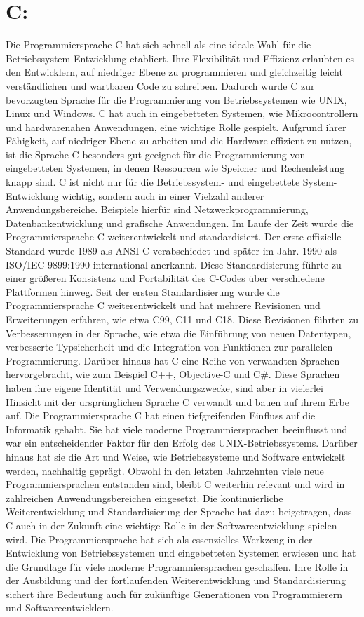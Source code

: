 \section{C:}
Die Programmiersprache C hat sich schnell als eine ideale Wahl für die Betriebssystem-Entwicklung etabliert. Ihre Flexibilität und Effizienz erlaubten es den Entwicklern, auf niedriger Ebene zu programmieren und gleichzeitig leicht verständlichen und wartbaren Code zu schreiben. 
Dadurch wurde C zur bevorzugten Sprache für die Programmierung von Betriebssystemen wie UNIX, Linux und Windows. C hat auch in eingebetteten Systemen, wie Mikrocontrollern und hardwarenahen Anwendungen, eine wichtige Rolle gespielt. 
Aufgrund ihrer Fähigkeit, auf niedriger Ebene zu arbeiten und die Hardware effizient zu nutzen, ist die Sprache C besonders gut geeignet für die Programmierung von eingebetteten Systemen, in denen Ressourcen wie Speicher und Rechenleistung knapp sind. 
C ist nicht nur für die Betriebssystem- und eingebettete System-Entwicklung wichtig, sondern auch in einer Vielzahl anderer Anwendungsbereiche. 
Beispiele hierfür sind Netzwerkprogrammierung, Datenbankentwicklung und grafische Anwendungen. Im Laufe der Zeit wurde die Programmiersprache C weiterentwickelt und standardisiert. 
Der erste offizielle Standard wurde 1989 als ANSI C verabschiedet und später im Jahr. 1990 als ISO/IEC 9899:1990 international anerkannt. Diese Standardisierung führte zu einer größeren Konsistenz und Portabilität des C-Codes über verschiedene Plattformen hinweg. 
Seit der ersten Standardisierung wurde die Programmiersprache C weiterentwickelt und hat mehrere Revisionen und Erweiterungen erfahren, wie etwa C99, C11 und C18. 
Diese Revisionen führten zu Verbesserungen in der Sprache, wie etwa die Einführung von neuen Datentypen, verbesserte Typsicherheit und die Integration von Funktionen zur parallelen Programmierung.
Darüber hinaus hat C eine Reihe von verwandten Sprachen hervorgebracht, wie zum Beispiel C++, Objective-C und C\#. 
Diese Sprachen haben ihre eigene Identität und Verwendungszwecke, sind aber in vielerlei Hinsicht mit der ursprünglichen Sprache C verwandt und bauen auf ihrem Erbe auf.
Die Programmiersprache C hat einen tiefgreifenden Einfluss auf die Informatik gehabt. Sie hat viele moderne Programmiersprachen beeinflusst und war ein entscheidender Faktor für den Erfolg des UNIX-Betriebssystems. 
Darüber hinaus hat sie die Art und Weise, wie Betriebssysteme und Software entwickelt werden, nachhaltig geprägt. 
Obwohl in den letzten Jahrzehnten viele neue Programmiersprachen entstanden sind, bleibt C weiterhin relevant und wird in zahlreichen Anwendungsbereichen eingesetzt. 
Die kontinuierliche Weiterentwicklung und Standardisierung der Sprache hat dazu beigetragen, dass C auch in der Zukunft eine wichtige Rolle in der Softwareentwicklung spielen wird.
Die Programmiersprache hat sich als essenzielles Werkzeug in der Entwicklung von Betriebssystemen und eingebetteten Systemen erwiesen und hat die Grundlage für viele moderne Programmiersprachen geschaffen. 
Ihre Rolle in der Ausbildung und der fortlaufenden Weiterentwicklung und Standardisierung sichert ihre Bedeutung auch für zukünftige Generationen von Programmierern und Softwareentwicklern.




